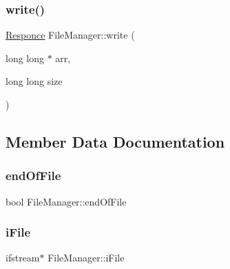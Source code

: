 \hypertarget{class_file_manager_ad4c96727180b0055942d20b7b5bfe5f8}{}\label{class_file_manager_ad4c96727180b0055942d20b7b5bfe5f8} 
\subsubsection{\texorpdfstring{write()}{write()}\hspace{0.1cm}{\footnotesize\ttfamily [2/2]}}
{\footnotesize\ttfamily \hyperlink{_structures_8h_a9864d6ef28dd6e38416afac4426b3491}{Responce} File\+Manager\+::write (\begin{DoxyParamCaption}\item[{long long $\ast$}]{arr,  }\item[{long long}]{size }\end{DoxyParamCaption})}



\subsection{Member Data Documentation}
\hypertarget{class_file_manager_ae43001594f1ee182581741d2530620a8}{}\label{class_file_manager_ae43001594f1ee182581741d2530620a8} 
\subsubsection{\texorpdfstring{end\+Of\+File}{endOfFile}}
{\footnotesize\ttfamily bool File\+Manager\+::end\+Of\+File\hspace{0.3cm}{\ttfamily [private]}}

\hypertarget{class_file_manager_a91fd33cbb230ed4974a678302e906a8d}{}\label{class_file_manager_a91fd33cbb230ed4974a678302e906a8d} 
\subsubsection{\texorpdfstring{i\+File}{iFile}}
{\footnotesize\ttfamily ifstream$\ast$ File\+Manager\+::i\+File\hspace{0.3cm}{\ttfamily [private]}}

\hypertarget{class_file_manager_aaa0e6feed45b6a92ce5c0b509bd9ceb6}{}\label{class_file_manager_aaa0e6feed45b6a92ce5c0b509bd9ceb6} 
